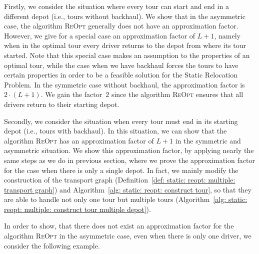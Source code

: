 \documentclass[english]{llncs}
\numberwithin{sublemma}{lemma}
\newcommand{\capd}{\ensuremath{L}}
\newcommand{\REOPT}{\textsc{ReOpt}\xspace}
\begin{document}
Firstly, we consider the situation where every tour can start and end in a different depot (i.e., tours without backhaul).
We show that in the asymmetric case, the algorithm \REOPT generally does not have an approximation factor.
However, we give for a special case an approximation factor of $\capd + 1$, namely when in the optimal tour every driver returns to the depot from where its tour started.
Note that this special case makes an assumption to the properties of an optimal tour,
while the case when we have backhaul forces the tours to have certain properties in order to be a feasible solution for the Static Relocation Problem.
In the symmetric case without backhaul, the approximation factor is $2\cdot(\capd + 1)$.
We gain the factor~$2$ since the algorithm \REOPT ensures that all drivers return to their starting depot.


Secondly, we consider the situation when every tour must end in its starting depot (i.e., tours with backhaul).
In this situation, we can show that the algorithm \REOPT has an approximation factor of $\capd + 1$ in the symmetric and asymmetric situation.
We show this approximation factor, by applying nearly the same steps as we do in previous section,
where we prove the approximation factor for the case when there is only a single depot.
In fact, we mainly modify the construction of the transport graph (Definition~\ref{def: static: reopt: multiple: transport graph}) and Algorithm~\ref{alg: static: reopt: construct tour},
so that they are able to handle not only one tour but multiple tours (Algorithm~\ref{alg: static: reopt: multiple: construct tour multiple depot}).


In order to show, that there does not exist an approximation factor for the algorithm \REOPT in the asymmetric case, even when there is only one driver, we consider the following example.
\end{document}
